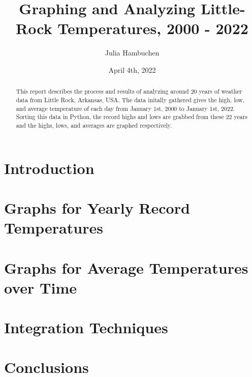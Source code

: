 \documentclass{article}
\begin{document}
\title{Graphing and Analyzing Little-Rock Temperatures, 2000 - 2022}
\author{Julia Hambuchen}
\date{April 4th, 2022}
\maketitle

\begin{abstract}
This report describes the process and results of analyzing around 20 years of weather data from Little Rock, Arkansas, USA. The data initally gathered gives the high, low, and average temperature of each day from January 1st, 2000 to January 1st, 2022. Sorting this data in Python, the record highs and lows are grabbed from these 22 years and the highs, lows, and averages are graphed respectively.
\end{abstract}

\section{Introduction}


\section{Graphs for Yearly Record Temperatures}


\section{Graphs for Average Temperatures over Time}


\section{Integration Techniques}


\section{Conclusions}




\end{document}
